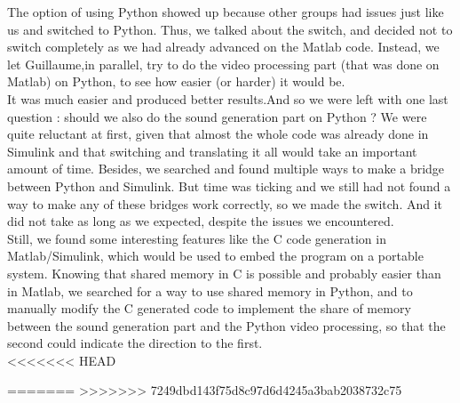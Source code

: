 \documentclass{rapport}
\begin{document}
The option of using Python showed up because other groups had issues just like us and switched to Python. Thus, we talked about the switch, and decided not to switch completely as we had already advanced on the Matlab code. Instead, we let Guillaume,in parallel, try to do the video processing part (that was done on Matlab) on Python, to see how easier (or harder) it would be.\\
It was much easier and produced better results.And so we were left with one last question : should we also do the sound generation part on Python ?
We were quite reluctant at first, given that almost the whole code was already done in Simulink and that switching and translating it all would take an important amount of time. Besides, we searched and found multiple ways to make a bridge between Python and Simulink. But time was ticking and we still had not found a way to make any of these bridges work correctly, so we made the switch. And it did not take as long as we expected, despite the issues we encountered. \\
Still, we found some interesting features like the C code generation in Matlab/Simulink, which would be used to embed the program on a portable system. Knowing that shared memory in C is possible and probably easier than in Matlab, we searched for a way to use shared memory in Python, and to manually modify the C generated code to implement the share of memory between the sound generation part and the Python video processing, so that the second could indicate the direction to the first.\\
<<<<<<< HEAD

=======
>>>>>>> 7249dbd143f75d8c97d6d4245a3bab2038732c75
\end{document}
